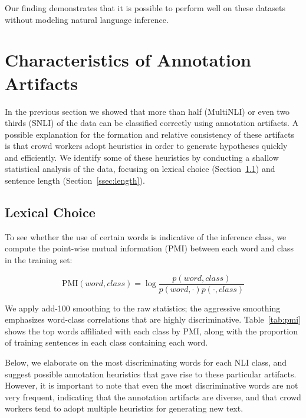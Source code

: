 Our finding demonstrates that it is possible to perform well on these datasets without modeling natural language inference.

\section{Characteristics of Annotation Artifacts}
\label{ssec:analysis}

In the previous section we showed that more than half (MultiNLI) or even two thirds (SNLI) of the data can be classified correctly using annotation artifacts. A possible explanation for the formation and relative consistency of these artifacts is that crowd workers adopt  heuristics in order to generate hypotheses quickly and efficiently. We identify some of these heuristics by conducting a shallow statistical analysis of the data, focusing on lexical choice (Section~\ref{ssec:lexical}) and sentence length (Section~\ref{ssec:length}).

\subsection{Lexical Choice} 
\label{ssec:lexical}

To see whether the use of certain words is indicative of the inference class, we compute the point-wise mutual information (PMI) between each word and class in the training set:

\begin{equation*}
\text{PMI} (\textit{word}, \textit{class}) = \log \frac{p(\textit{word}, \textit{class})}{p(\textit{word}, \cdot) p(\cdot, \textit{class})}
\end{equation*}

We apply add-100 smoothing to the raw statistics; the aggressive smoothing emphasizes word-class correlations that are highly discriminative. 
Table~\ref{tab:pmi} shows the top words affiliated with each class by PMI, along with the proportion of training sentences in each class containing each word.

Below, we elaborate on the most discriminating words for each NLI class, and suggest possible annotation heuristics that gave rise to these particular artifacts. However, it is important to note that even the most discriminative words are not very frequent, indicating that the annotation artifacts are diverse, and that crowd workers tend to adopt multiple heuristics for generating new text. 

